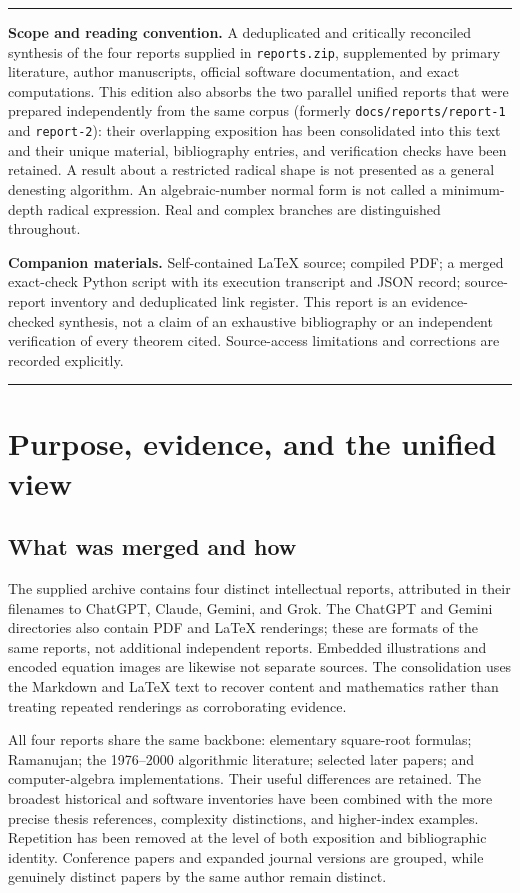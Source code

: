 \documentclass[11pt,oneside]{article}
\numberwithin{equation}{section}
\theoremstyle{definition}
\theoremstyle{remark}
\newenvironment{boxedremark}{%
  \par\smallskip\noindent\begin{center}\begin{minipage}{0.94\textwidth}%
  \color{black}\hrule\vspace{0.6em}\small
}{%
  \vspace{0.6em}\hrule\end{minipage}\end{center}\smallskip
}
\begin{document}
\begin{boxedremark}\textbf{Scope and reading convention.}\space
A deduplicated and critically reconciled synthesis of the four reports supplied in \texttt{reports.zip}, supplemented by primary literature, author manuscripts, official software documentation, and exact computations. This edition also absorbs the two parallel unified reports that were prepared independently from the same corpus (formerly \texttt{docs/reports/report-1} and \texttt{report-2}): their overlapping exposition has been consolidated into this text and their unique material, bibliography entries, and verification checks have been retained. A result about a restricted radical shape is not presented as a general denesting algorithm. An algebraic-number normal form is not called a minimum-depth radical expression. Real and complex branches are distinguished throughout.

\smallskip\noindent\textbf{Companion materials.} Self-contained LaTeX source; compiled PDF; a merged exact-check Python script with its execution transcript and JSON record; source-report inventory and deduplicated link register. This report is an evidence-checked synthesis, not a claim of an exhaustive bibliography or an independent verification of every theorem cited. Source-access limitations and corrections are recorded explicitly.
\end{boxedremark}

\tableofcontents
\newpage

\section{Purpose, evidence, and the unified view}\label{sec:scope}

\subsection{What was merged and how}
The supplied archive contains four distinct intellectual reports, attributed in their filenames to ChatGPT, Claude, Gemini, and Grok. The ChatGPT and Gemini directories also contain PDF and LaTeX renderings; these are formats of the same reports, not additional independent reports. Embedded illustrations and encoded equation images are likewise not separate sources. The consolidation uses the Markdown and LaTeX text to recover content and mathematics rather than treating repeated renderings as corroborating evidence.

All four reports share the same backbone: elementary square-root formulas; Ramanujan; the 1976--2000 algorithmic literature; selected later papers; and computer-algebra implementations. Their useful differences are retained. The broadest historical and software inventories have been combined with the more precise thesis references, complexity distinctions, and higher-index examples. Repetition has been removed at the level of both exposition and bibliographic identity. Conference papers and expanded journal versions are grouped, while genuinely distinct papers by the same author remain distinct.
\end{document}
